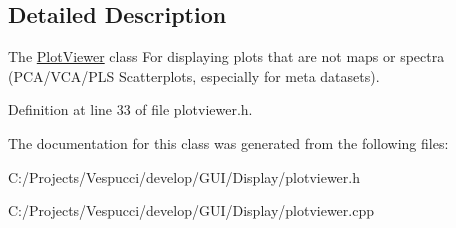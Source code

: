 \subsection{Detailed Description}
The \hyperlink{class_plot_viewer}{Plot\+Viewer} class For displaying plots that are not maps or spectra (P\+C\+A/\+V\+C\+A/\+P\+L\+S Scatterplots, especially for meta datasets). 

Definition at line 33 of file plotviewer.\+h.



The documentation for this class was generated from the following files\+:\begin{DoxyCompactItemize}
\item 
C\+:/\+Projects/\+Vespucci/develop/\+G\+U\+I/\+Display/plotviewer.\+h\item 
C\+:/\+Projects/\+Vespucci/develop/\+G\+U\+I/\+Display/plotviewer.\+cpp\end{DoxyCompactItemize}
